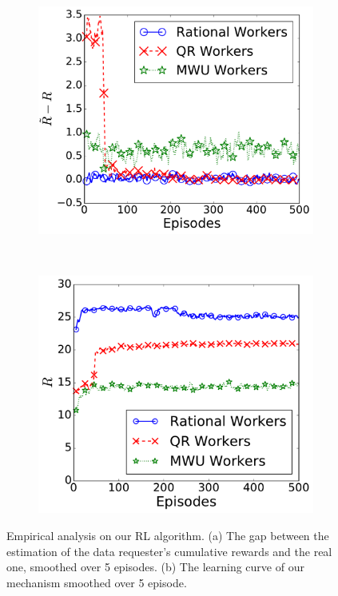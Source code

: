 \begin{figure}[!t]
   \setlength{\abovecaptionskip}{0mm}
    \centering
    \begin{subfigure}[t]{0.24\textwidth}
        \centering
        \includegraphics[width=\textwidth]{image/RIL1}%
		\vspace{-1mm}
        \caption{\label{figure:rewardError}}
    \end{subfigure}%
~
    \begin{subfigure}[t]{0.23\textwidth}
        \centering
        \includegraphics[width=\textwidth]{image/RIL2}%
		\vspace{-1mm}
        \caption{\label{figure:learningCurve}}
    \end{subfigure}
    \vspace{-2mm}
    \caption{\label{figure:learning}Empirical analysis on our RL algorithm. (a) The gap between the estimation of the data requester's cumulative rewards and the real one, smoothed over 5 episodes. (b) The learning curve of our mechanism smoothed over 5 episode.}
	\vspace{-1mm}
\end{figure}
